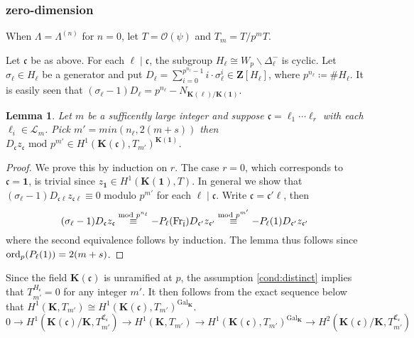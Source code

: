\documentclass[leqno]{amsart}
\newcommand{\flw}{\bar{\fl}}
\newcommand{\Fr}{\textnormal{Fr}} %
\DeclareMathOperator{\Gal}{Gal}
\newcommand{\ord}{\textnormal{ord}}
\newcommand{\id}{\mathbf{1}}
\newcommand{\Z}{{\mathbf{Z}}}
\newcommand{\K}{{\mathbf{K}}} %
\newcommand{\oo}{\mathcal{O}} %
\newcommand{\rp}[1]{\mathfrak{C}_{#1}} %
\newcommand{\rs}[1]{H_{#1}} %
\newcommand{\rk}[1]{\K({#1})} %
\newcommand{\fc}{\mathfrak{c}}
\newcommand{\fl}{\mathfrak{l}}
\newtheorem{lem}[thm]{Lemma}
\theoremstyle{definition}
\theoremstyle{remark}
\begin{document}
\subsubsection{zero-dimension}

When $\Lambda=\Lambda^{(n)}$ for $n=0$,
let  $T=\oo(\psi)$ and  $T_m=T/p^mT$.

Let $\fc$ be as above.
For each $\ell\mid\fc$,
the subgroup  $\rs{\ell}\cong W_p\backslash \Delta_\ell^-$
is cyclic.
Let  $\sigma_\ell\in \rs{\ell}$ be a generator
and put 
$D_\ell=\sum_{i=0}^{p^{n_\ell}-1}i\cdot \sigma_\ell^i
\in \Z[\rs{\ell}]$,
where $p^{n_\ell}\coloneqq \#\rs{\ell}$.
It is easily seen that 
$(\sigma_\ell-1)D_\ell=p^{n_\ell}-N_{\rk{\ell}/\rk{\id}}$.

\begin{lem}
Let $m$ be a sufficently large integer and
suppose $\fc=\ell_1\cdots\ell_r$
with each $\ell_i\in\mathcal{L}_m$.
Pick $m'=min(n_\ell, 2(m+s))$ then
$D_{\fc}z_{\fc}\text{ mod }p^{m'}\in 
H^1(\rk{\fc},T_{m'})^{\rk{\id}}$.
\end{lem}
\begin{proof}
We prove this by induction on $r$.
The case $r=0$, which corresponds to 
$\fc=\id$, is trivial
since $z_{\id}\in H^1(\rk{\id},T)$.
In general
we show that 
$(\sigma_\ell-1)D_{\fc\ell}z_{\fc\ell}\equiv 0$
modulo  $p^{m'}$ for each $\ell\mid \fc$.
Write $\fc=\fc'\ell$, then
\[
	 (\sigma_\ell-1)D_{\fc}z_{\fc}
	 \overset{\text{mod } p^{n_\ell}}{\equiv}
	 -P_\ell(\Fr_{\flw})D_{\fc'}z_{\fc'}
	 \overset{\text{mod } p^{m'}}{\equiv}
	 -P_\ell(1)D_{\fc'}z_{\fc'}
\]
where the second equivalence follows by induction.
The lemma thus follows
since $\ord_p(P_\ell(1))=2(m+s)$.
\end{proof}
Since the field $\rk{\fc}$
is unramified at  $p$,
the assumption \eqref{cond:distinct}
implies that $T_{m'}^{\rs{\fc}}=0$
for any integer $m'$. 
It then follows from the exact sequence below
that $H^1(\K, T_{m'})\cong 
H^1(\rk{\fc}, T_{m'})^{\Gal_\K}$.
\[
	0\to H^1(\rk{\fc}/\K, T_{m'}^{\rp{\fc}})\to
	H^1(\K, T_{m'})\to
	H^1(\rk{\fc}, T_{m'})^{\Gal_\K}\to
	H^2(\rk{\fc}/\K, T_{m'}^{\rp{\fc}})
\]
\end{document}
